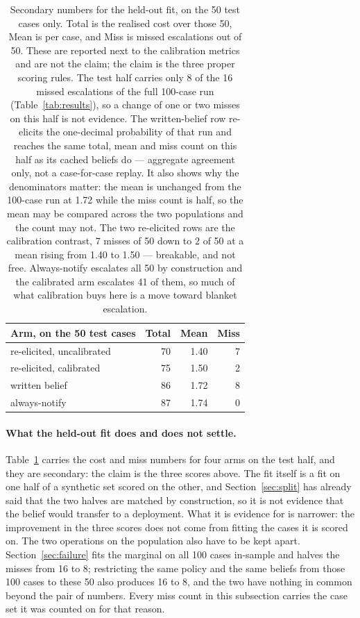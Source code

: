 \documentclass{article}
\begin{document}
\begin{table}[t]
\centering
\begin{tabular}{lrrr}
\toprule
Arm, on the 50 test cases & Total & Mean & Miss \\
\midrule
re-elicited, uncalibrated & 70 & 1.40 & 7 \\
re-elicited, calibrated   & 75 & 1.50 & 2 \\
written belief            & 86 & 1.72 & 8 \\
always-notify             & 87 & 1.74 & 0 \\
\bottomrule
\end{tabular}
\caption{Secondary numbers for the held-out fit, on the 50 test cases only. Total
is the realised cost over those 50, Mean is per case, and Miss is missed
escalations out of 50. These are reported next to the calibration metrics and are
not the claim; the claim is the three proper scoring rules. The test half carries
only 8 of the 16 missed escalations of the full 100-case run
(Table~\ref{tab:results}), so a change of one or two misses on this half is not
evidence. The written-belief row re-elicits the one-decimal probability of that run
and reaches the same total, mean and miss count on this half as its cached beliefs
do --- aggregate agreement only, not a case-for-case replay. It also shows why the
denominators matter: the mean is unchanged from the 100-case run at 1.72 while the
miss count is half, so the mean may be compared across the two populations and the
count may not. The two re-elicited rows are the calibration contrast, 7 misses of
50 down to 2 of 50 at a mean rising from 1.40 to 1.50 --- breakable, and not free.
Always-notify escalates all 50 by construction and the calibrated arm escalates 41
of them, so much of what calibration buys here is a move toward blanket
escalation.}
\label{tab:calibration}
\end{table}

\paragraph{What the held-out fit does and does not settle.}
Table~\ref{tab:calibration} carries the cost and miss numbers for four arms on the
test half, and they are secondary: the claim is the three scores above. The fit
itself is a fit on one half of a synthetic set scored on the other, and
Section~\ref{sec:split} has already said that the two halves are matched by
construction, so it is not evidence that the belief would transfer to a deployment.
What it is evidence for is narrower: the improvement in the three scores does not
come from fitting the cases it is scored on. The two operations on the population
also have to be kept apart. Section~\ref{sec:failure} fits the marginal on all 100
cases in-sample and halves the misses from 16 to 8; restricting the same policy and
the same beliefs from those 100 cases to these 50 also produces 16 to 8, and the
two have nothing in common beyond the pair of numbers. Every miss count in this
subsection carries the case set it was counted on for that reason.
\end{document}
